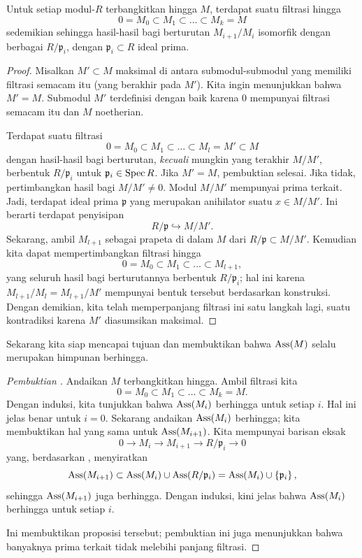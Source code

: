 \begin{proposition}[D{\'e}vissage] \label{filtrationlemma} \label{devissage}
Untuk setiap modul-$R$ terbangkitkan hingga $M$, terdapat suatu filtrasi hingga
\[ 0 = M_0 \subset M_1 \subset \dots \subset M_k = M  \]
sedemikian sehingga hasil-hasil bagi berturutan $M_{i+1}/M_i$ isomorfik dengan berbagai
$R/\mathfrak{p}_i$, dengan $\mathfrak{p}_i \subset R$ ideal prima.
\end{proposition} 
\begin{proof} 
Misalkan $M' \subset M$ maksimal di antara submodul-submodul yang memiliki filtrasi semacam itu
(yang berakhir pada $M'$).
Kita ingin menunjukkan bahwa $M' = M$. Submodul $M'$ terdefinisi dengan baik karena
$0$ mempunyai filtrasi semacam itu dan $M$
noetherian.  

Terdapat suatu filtrasi
\[ 0 = M_0 \subset M_1 \subset \dots \subset M_l = M' \subset M  \]
dengan hasil-hasil bagi berturutan, \emph{kecuali} mungkin yang terakhir $M/M'$, berbentuk
$R/\mathfrak{p}_i $ untuk $\mathfrak{p}_i \in \operatorname{Spec} R$.
Jika $M' = M$, pembuktian selesai. Jika tidak, pertimbangkan
hasil bagi $M/M' \neq 0$. Modul $M/M'$ mempunyai prima terkait. Jadi, terdapat
ideal prima $\mathfrak{p}$ yang merupakan anihilator suatu $x \in M/M'$. Ini berarti
terdapat penyisipan 
\[ R/\mathfrak{p} \hookrightarrow M/M'.  \]
Sekarang, ambil $M_{l+1}$ sebagai prapeta di dalam $M$
dari $R/\mathfrak{p} \subset M/M'$. 
Kemudian kita dapat mempertimbangkan filtrasi hingga
\[ 0 = M_0 \subset M_1 \subset \dots \subset M_{l+1} , \]
yang seluruh hasil bagi berturutannya berbentuk $R/\mathfrak{p}_i$; hal ini
karena $M_{l+1}/M_l = M_{l+1}/M'$ mempunyai bentuk tersebut berdasarkan konstruksi.
Dengan demikian, kita telah memperpanjang filtrasi ini satu
langkah lagi, suatu kontradiksi karena
$M'$ diasumsikan maksimal.
\end{proof} 

Sekarang kita siap mencapai tujuan dan membuktikan bahwa $\operatorname{Ass}(M)$
selalu merupakan himpunan berhingga. 
\begin{proof}[Pembuktian ]
Andaikan $M$ terbangkitkan hingga. Ambil filtrasi kita
\[ 0 = M_0 \subset M_1 \subset \dots \subset M_k = M.  \]
Dengan induksi, kita tunjukkan bahwa $\operatorname{Ass}(M_i)$ berhingga untuk setiap $i$. Hal ini jelas
benar untuk $i=0$. Sekarang andaikan $\operatorname{Ass}(M_i)$ berhingga; kita membuktikan hal yang sama untuk
$\operatorname{Ass}(M_{i+1})$. Kita mempunyai barisan eksak
\[ 0 \to M_i \to M_{i+1} \to R/\mathfrak{p}_i \to 0  \]
yang, berdasarkan , menyiratkan
\[ \operatorname{Ass}(M_{i+1}) \subset \operatorname{Ass}(M_i) \cup \operatorname{Ass}(R/\mathfrak{p}_i) = \operatorname{Ass}(M_i)
\cup \left\{\mathfrak{p}_i\right\} , \]
sehingga $\operatorname{Ass}(M_{i+1})$ juga berhingga.
Dengan induksi, kini jelas bahwa $\operatorname{Ass}(M_i)$ berhingga untuk setiap $i$.

Ini membuktikan proposisi tersebut; pembuktian ini juga menunjukkan bahwa banyaknya
prima terkait tidak melebihi panjang filtrasi. 
\end{proof} 


